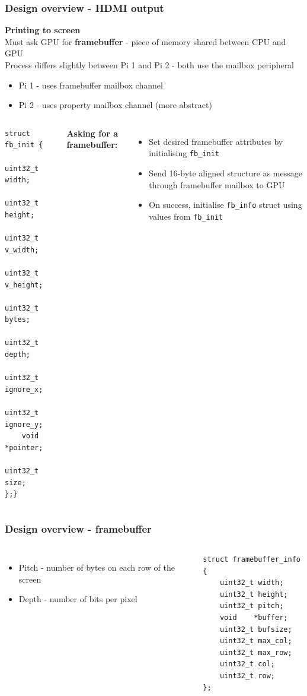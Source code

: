 \documentclass[10pt]{beamer}
\newcommand{\code}[1]{\texttt{#1}}
\begin{document}
\begin{frame}[fragile]
    \frametitle{Design overview - HDMI output}

    \textbf{Printing to screen} \\
    Must ask GPU for \textbf{framebuffer} - piece of memory shared between CPU
    and GPU \\
    Process differs slightly between Pi 1 and Pi 2 - both use the mailbox
    peripheral
    \begin{itemize}
        \item Pi 1 - uses framebuffer mailbox channel
        \item Pi 2 - uses property mailbox channel (more abstract)
    \end{itemize}

    \begin{columns}
        \lstset{language=C,basicstyle=\ttfamily}
        \begin{lstlisting}
struct fb_init {
    uint32_t width;
    uint32_t height;
    uint32_t v_width;
    uint32_t v_height;
    uint32_t bytes;
    uint32_t depth;
    uint32_t ignore_x;
    uint32_t ignore_y;
    void    *pointer;
    uint32_t size;
};}
        \end{lstlisting}

        \textbf{Asking for a framebuffer:}
        \begin{itemize}
            \item Set desired framebuffer attributes by initialising
                \code{fb\_init}
            \item Send 16-byte aligned structure as message through framebuffer
                mailbox to GPU
            \item On success, initialise \code{fb\_info} struct using values
                from \code{fb\_init}
        \end{itemize}
    \end{columns}
\end{frame}

\begin{frame}[fragile]
    \frametitle{Design overview - framebuffer}
    \begin{columns}
        \begin{itemize}
            \item Pitch - number of bytes on each row of the screen
            \item Depth - number of bits per pixel
        \end{itemize}

        \lstset{language=C,basicstyle=\ttfamily}
        \begin{lstlisting}
struct framebuffer_info {
    uint32_t width;
    uint32_t height;
    uint32_t pitch;
    void    *buffer;
    uint32_t bufsize;
    uint32_t max_col;
    uint32_t max_row;
    uint32_t col;
    uint32_t row;
};
        \end{lstlisting}
    \end{columns}

\end{frame}
\end{document}
